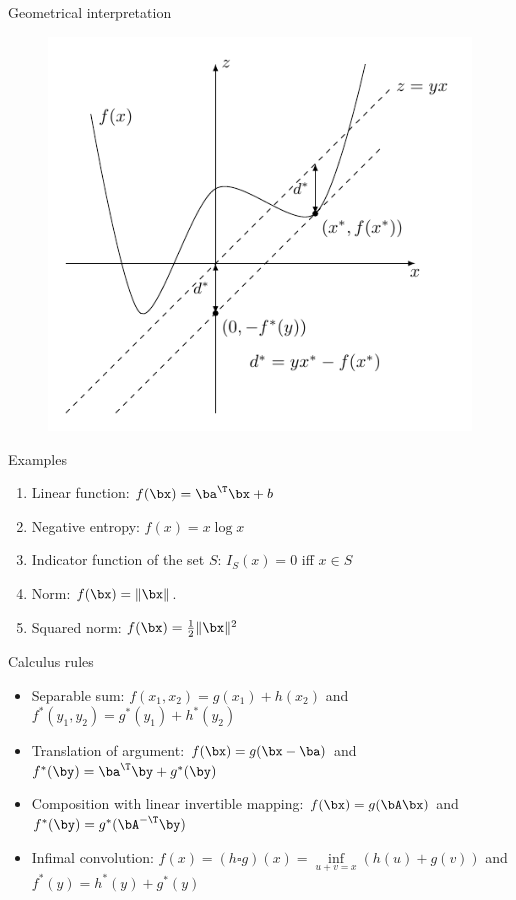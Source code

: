 \documentclass[12pt]{beamer}
\begin{document}
\begin{frame}{Geometrical interpretation}
\begin{figure}
\includegraphics[scale=1]{geom.pdf}
\end{figure}
\end{frame}

\begin{frame}{Examples}
\begin{enumerate}
\item Linear function: $f(\bx) = \ba^{\T}\bx + b$
\item Negative entropy: $f(x) = x\log x$
\item Indicator function of the set $S$: $I_S(x) = 0$ iff $x \in S$
\item Norm: $f(\bx) = \|\bx\|$.
\item Squared norm: $f(\bx) = \frac{1}{2}\|\bx\|^2$
\end{enumerate}
\end{frame}

\begin{frame}{Calculus rules}

\begin{itemize}
\item Separable sum: $f(x_1, x_2) = g(x_1) + h(x_2)$ and $f^*(y_1, y_2) = g^*(y_1) + h^*(y_2)$
\item Translation of argument: $f(\bx) = g(\bx - \ba)$ and $f^*(\by) = \ba^{\T}\by + g^*(\by)$
\item Composition with linear invertible mapping: $f(\bx) = g(\bA\bx)$ and $f^*(\by) = g^*(\bA^{-\T}\by)$
\item Infimal convolution:  $f(x) = (h \square g)(x) = \inf\limits_{u + v = x} (h(u) + g(v))$ and $f^*(y) = h^*(y) + g^*(y)$
\end{itemize}

\end{frame}
\end{document}
